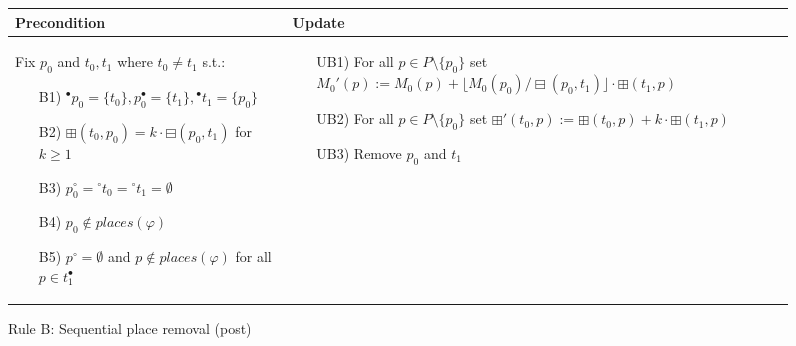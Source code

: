 \begin{figure}[h]
    \begin{adjustbox}{center}
        \begin{tabular}{|p{70mm}|p{62mm}|} \hline
        Precondition & Update \\ \hline
        Fix $p_0$ and $t_0,t_1$ where $t_0\neq t_1$ s.t.:
        \begin{itemize}[leftmargin=10mm]
            \item[B1)] ${}^\bullet p_0=\{t_0\}, p_0^\bullet=\{t_1\},{}^\bullet t_1=\{p_0\}$
            \item[B2)] $\boxplus(t_0,p_0)=k\cdot\boxminus(p_0, t_1)$ for $k\geq 1$
            \item[B3)] $p_0^\circ ={}^\circ t_0={}^\circ t_1=\emptyset$
            \item[B4)] $p_0\notin places(\varphi)$
            \item[B5)] $p^\circ =\emptyset$ and $p\notin places(\varphi)$ for all $p\in t_1^\bullet$
        \end{itemize} &
        \begin{itemize}[leftmargin=10mm]
            \item[UB1)] For all $p\in P\setminus\{p_0\}$ set $M_0'(p):=M_0(p)+\lfloor M_0(p_0)/\boxminus(p_0,t_1)\rfloor\cdot\boxplus(t_1,p)$
            \item[UB2)] For all $p\in P\setminus\{p_0\}$ set $\boxplus'(t_0,p):=\boxplus(t_0,p)+k\cdot\boxplus(t_1,p)$
            \item[UB3)] Remove $p_0$ and $t_1$
        \end{itemize} \\ \hline
        \end{tabular}
    \end{adjustbox}
    \caption{Rule B: Sequential place removal (post)}
    \label{fig:rule_b_post}
\end{figure}
